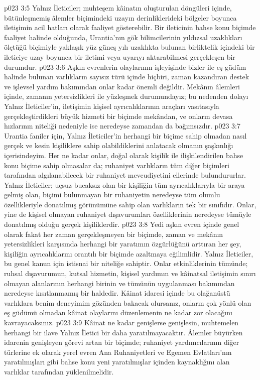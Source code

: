 \vs p023 3:5 Yalnız İleticiler; muhteşem kâinatın oluşturulan döngüleri içinde, bütünleşmemiş âlemler biçimindeki uzayın derinliklerideki bölgeler boyunca iletişimin acil hatları olarak faaliyet gösterebilir. Bir ileticinin bahse konu biçimde faaliyet halinde olduğunda, Urantia’nın gök bilimcilerinin yıldızsal uzaklıkları ölçtüğü biçimiyle yaklaşık yüz güneş yılı uzaklıkta bulunan birliktelik içindeki bir ileticiye uzay boyunca bir iletimi veya uyarıyı aktarabilmesi gerçekleşen bir durumdur.
\vs p023 3:6 Aşkın evrenlerin olaylarının işleyişinde bizler ile eş güdüm halinde bulunan varlıkların sayısız türü içinde hiçbiri, zaman kazandıran destek ve işlevsel yardım bakımından onlar kadar önemli değildir. Mekânın âlemleri içinde, zamanın yetersizlikleri ile yüzleşmek durumundayız; bu nedenden dolayı Yalnız İleticiler’in, iletişimin kişisel ayrıcalıklarının araçları vasıtasıyla gerçekleştirdikleri büyük hizmeti bir biçimde mekândan, ve onların devasa hızlarının niteliği nedeniyle ise neredeyse zamandan da bağımsızdır.
\vs p023 3:7 Urantia faniler için, Yalnız İleticiler’in herhangi bir biçime sahip olmadan nasıl gerçek ve kesin kişiliklere sahip olabildiklerini anlatacak olmanın şaşkınlığı içerisindeyim. Her ne kadar onlar, doğal olarak kişilik ile ilişkilendirilen bahse konu biçime sahip olmasalar da; ruhaniyet varlıkların tüm diğer biçimleri tarafından algılanabilecek bir ruhaniyet mevcudiyetini ellerinde bulundururlar. Yalnız İleticiler; uçsuz bucaksız olan bir kişiliğin tüm ayrıcalıklarıyla bir araya gelmiş olan, biçimi bulunmayan bir ruhaniyetin neredeyse tüm olumlu özellikleriyle donatılmış görünümüne sahip olan varlıkların tek bir sınıfıdır. Onlar, yine de kişisel olmayan ruhaniyet dışavurumları özelliklerinin neredeyse tümüyle donatılmış olduğu gerçek kişiliklerdir.
\vs p023 3:8 Yedi aşkın evren içinde genel olarak fakat her zaman gerçekleşmeyen bir biçimde, zaman ve mekânın yetersizlikleri karşısında herhangi bir yaratımın özgürlüğünü arttıran her şey, kişiliğin ayrıcalıklarını orantılı bir biçimde azaltmaya eğilimlidir. Yalnız İleticiler, bu genel kanun için istisnai bir niteliğe sahiptir. Onlar etkinliklerinin tümünde; ruhsal dışavurumun, kutsal hizmetin, kişisel yardımın ve kâinatsal iletişimin sınırı olmayan alanlarının herhangi birinin ve tümünün uygulanması bakımından neredeyse kısıtlanmamış bir haldedir. Kâinat idaresi içinde bu olağanüstü varlıklara benim deneyimim gözünden bakacak olursanız, onların çok yönlü olan eş güdümü olmadan kâinat olaylarını düzenlemenin ne kadar zor olacağını kavrayacaksınız.
\vs p023 3:9 Kâinat ne kadar genişlerse genişlesin, muhtemelen herhangi bir ilave Yalnız İletici bir daha yaratılmayacaktır. Âlemler büyürken idarenin genişleyen görevi artan bir biçimde; ruhaniyet yardımcılarının diğer türlerine ek olarak yerel evren Ana Ruhaniyetleri ve Egemen Evlatları’nın yaratılmışları gibi bahse konu yeni yaratılmışlar içinden kaynaklığını alan varlıklar tarafından yüklenilmelidir.
